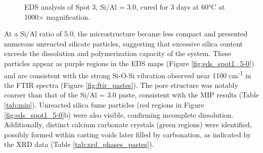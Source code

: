 \begin{figure}[H]
    \centering
    \hfill
    \caption{EDS analysis of Spot 3, Si/Al = 3.0, cured for 3 days at 60°C at 1000× magnification.}
    \label{fig:eds_spot3_3-0}
\end{figure}

At a Si/Al ratio of 5.0, the microstructure became less compact and presented numerous unreacted silicate particles, suggesting that excessive silica content exceeds the dissolution and polymerization capacity of the system.
These particles appear as purple regions in the EDS maps (Figure \ref{fig:eds_spot1_5-0}) and are consistent with the strong Si-O-Si vibration observed near 1100 cm\textsuperscript{-1} in the FTIR spectra (Figure \ref{fig:ftir_pastes}).
The pore structure was notably coarser than that of the Si/Al = 3.0 paste, consistent with the MIP results (Table \ref{tab:mip}).
Unreacted silica fume particles (red regions in Figure \ref{fig:eds_spot1_5-0}b) were also visible, confirming incomplete dissolution.
Additionally, distinct calcium carbonate crystals (green regions) were identified, possibly formed within casting voids later filled by carbonation, as indicated by the XRD data (Table \ref{tab:xrd_phases_pastes}).

